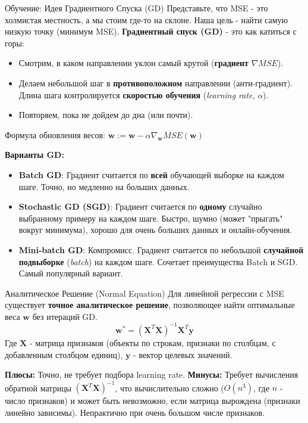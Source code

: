 \begin{myexampleblock}{Обучение: Идея Градиентного Спуска (GD)}
Представьте, что MSE - это холмистая местность, а мы стоим где-то на склоне. Наша цель - найти самую низкую точку (минимум MSE). \textbf{Градиентный спуск (GD)} - это как катиться с горы:
\begin{itemize}
    \item Смотрим, в каком направлении уклон самый крутой (\textbf{градиент} $\nabla MSE$).
    \item Делаем небольшой шаг в \textbf{противоположном} направлении (анти-градиент). Длина шага контролируется \textbf{скоростью обучения} (\textit{learning rate}, $\alpha$).
    \item Повторяем, пока не дойдем до дна (или почти).
\end{itemize}
Формула обновления весов: $\mathbf{w} := \mathbf{w} - \alpha \nabla_{\mathbf{w}} MSE(\mathbf{w})$

\textbf{Варианты GD:}
\begin{itemize}
    \item \textbf{Batch GD}: Градиент считается по \textbf{всей} обучающей выборке на каждом шаге. Точно, но медленно на больших данных.
    \item \textbf{Stochastic GD (SGD)}: Градиент считается по \textbf{одному} случайно выбранному примеру на каждом шаге. Быстро, шумно (может "прыгать" вокруг минимума), хорошо для очень больших данных и онлайн-обучения.
    \item \textbf{Mini-batch GD}: Компромисс. Градиент считается по небольшой \textbf{случайной подвыборке} (\textit{batch}) на каждом шаге. Сочетает преимущества Batch и SGD. Самый популярный вариант.
\end{itemize}
\end{myexampleblock}

\begin{textbox}{Аналитическое Решение (Normal Equation)}
Для линейной регрессии с MSE существует \textbf{точное аналитическое решение}, позволяющее найти оптимальные веса $\mathbf{w}$ без итераций GD.
\[
\mathbf{w}^* = (\mathbf{X}^T \mathbf{X})^{-1} \mathbf{X}^T \mathbf{y}
\]
Где $\mathbf{X}$ - матрица признаков (объекты по строкам, признаки по столбцам, с добавленным столбцом единиц), $\mathbf{y}$ - вектор целевых значений.

\textbf{Плюсы:} Точно, не требует подбора learning rate.
\textbf{Минусы:} Требует вычисления обратной матрицы $(\mathbf{X}^T \mathbf{X})^{-1}$, что вычислительно сложно ($O(n^3)$, где $n$ - число признаков) и может быть невозможно, если матрица вырождена (признаки линейно зависимы). Непрактично при очень большом числе признаков.
\end{textbox}

